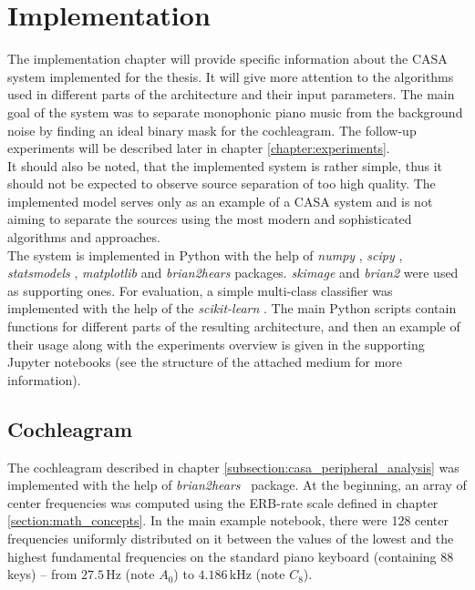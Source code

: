 \chapter{Implementation}\label{chapter:implementation}

The implementation chapter will provide specific information about the CASA system implemented for the thesis. It will give more attention to the algorithms used in different parts of the architecture and their input parameters. The main goal of the system was to separate monophonic piano music from the background noise by finding an ideal binary mask for the cochleagram. The follow-up experiments will be described later in chapter \ref{chapter:experiments}.\\

It should also be noted, that the implemented system is rather simple, thus it should not be expected to observe source separation of too high quality. The implemented model serves only as an example of a CASA system and is not aiming to separate the sources using the most modern and sophisticated algorithms and approaches.\\

The system is implemented in Python with the help of \textit{numpy} \cite{numpy}, \textit{scipy} \cite{scipy}, \textit{statsmodels} \cite{statsmodels}, \textit{matplotlib} \cite{matplotlib} and \textit{brian2hears} \cite{brian2hears} packages. \textit{skimage} \cite{scikit-image} and \textit{brian2} \cite{brian2} were used as supporting ones. For evaluation, a simple multi-class classifier was implemented with the help of the \textit{scikit-learn} \cite{scikit-learn}. The main Python scripts contain functions for different parts of the resulting architecture, and then an example of their usage along with the experiments overview is given in the supporting Jupyter notebooks (see the structure of the attached medium for more information).

\section{Cochleagram}

The cochleagram described in chapter \ref{subsection:casa_peripheral_analysis} was implemented with the help of \textit{brian2hears}~\cite{brian2hears} package. At the beginning, an array of center frequencies was computed using the ERB-rate scale defined in chapter \ref{section:math_concepts}. In the main example notebook, there were 128 center frequencies uniformly distributed on it between the values of the lowest and the highest fundamental frequencies on the standard piano keyboard (containing 88 keys) -- from $27.5$\,Hz (note $A_0$) to $4.186$\,kHz (note $C_8$).\\


